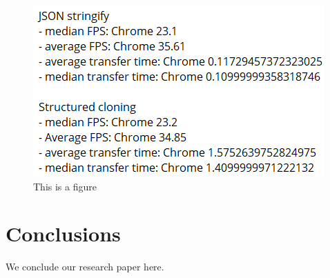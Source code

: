 \documentclass[conference]{IEEEtran}
\begin{document}
\begin{figure}[ht]
	\centering
	\includegraphics[scale=0.5]{figs/example.png}
	\caption{This is a figure}
	\label{fig:labeloffigure}
\end{figure}

\section{Conclusions}
\label{sec:conc}

We conclude our research paper here.

\printbibliography[title={References}]
\end{document}

